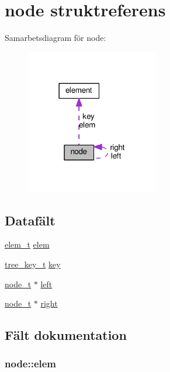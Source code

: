 \hypertarget{structnode}{}\section{node struktreferens}
\label{structnode}


Samarbetsdiagram för node\+:\nopagebreak
\begin{figure}[H]
\begin{center}
\leavevmode
\includegraphics[width=165pt]{structnode__coll__graph}
\end{center}
\end{figure}
\subsection*{Datafält}
\begin{DoxyCompactItemize}
\item 
\hyperlink{common_8h_a7fdd31df4fac71b8c34af47c7d45226a}{elem\+\_\+t} \hyperlink{structnode_a5f9ee8710ff865cda6ed144d91a32121}{elem}
\item 
\hyperlink{tree_8h_af42dd67b55ffc67649d20c46e9cbf84f}{tree\+\_\+key\+\_\+t} \hyperlink{structnode_aa6b692707ee43532d0437efb6f060dfd}{key}
\item 
\hyperlink{tree_8h_a7c02633e18d6aa5f58539b75f08753d9}{node\+\_\+t} $\ast$ \hyperlink{structnode_aacd557e63e1f9dca9048ed58bb3dbb2c}{left}
\item 
\hyperlink{tree_8h_a7c02633e18d6aa5f58539b75f08753d9}{node\+\_\+t} $\ast$ \hyperlink{structnode_a8ab67b704953f3699d566a1a5d6047ad}{right}
\end{DoxyCompactItemize}


\subsection{Fält dokumentation}
\subsubsection[{\texorpdfstring{elem}{elem}}]{ node\+::elem}\hypertarget{structnode_a5f9ee8710ff865cda6ed144d91a32121}{}\label{structnode_a5f9ee8710ff865cda6ed144d91a32121}
